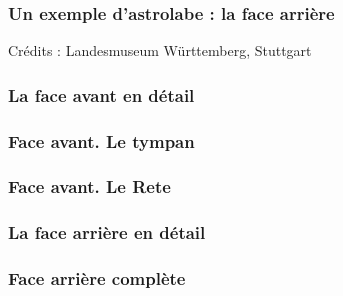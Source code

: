 \documentclass{beamer}
\begin{document}
   \begin{frame}\frametitle{Un exemple d'astrolabe : la face arrière}
\begin{center}
\end{center}
{\hfill Crédits : Landesmuseum Württemberg, Stuttgart}
   \end{frame}
   

\begin{frame}\frametitle{La face avant en détail}
\begin{center}
\end{center}

   \end{frame}
 
   
\begin{frame}\frametitle{Face avant. Le tympan}
\begin{center}
\end{center}
   \end{frame}


\begin{frame}\frametitle{Face avant. Le Rete}
\begin{center}
\end{center}
   \end{frame} 



\begin{frame}\frametitle{La face arrière en détail}
\begin{center}
\end{center}
   \end{frame}
   
   \begin{frame}\frametitle{Face arrière complète}
\begin{center}
\end{center}
   \end{frame}
   
\end{document}
